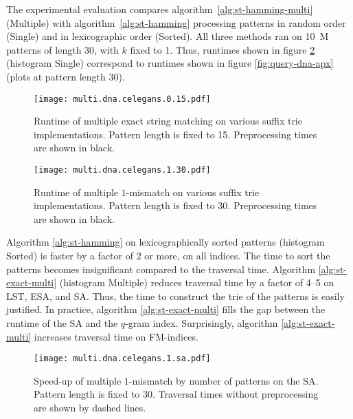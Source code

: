 The experimental evaluation compares algorithm~\ref{alg:st-hamming-multi} (Multiple) with algorithm~\ref{alg:st-hamming} processing patterns in random order (Single) and in lexicographic order (Sorted).
All three methods ran on 10~M patterns of length 30, with $k$ fixed to 1.
Thus, runtimes shown in figure \ref{fig:query-dna-apx-multi} (histogram Single) correspond to runtimes shown in figure \ref{fig:query-dna-apx} (plots at pattern length 30).

\begin{figure}[t]
\begin{center}
\caption[Multiple exact string matching runtime]{Runtime of multiple exact string matching on various suffix trie implementations. Pattern length is fixed to 15. Preprocessing times are shown in black.}
\label{fig:query-dna-exact-multi}
\texttt{[image: multi.dna.celegans.0.15.pdf]}
\end{center}
\vspace{-5mm}
\end{figure}

\begin{figure}[b]
\begin{center}
\caption[Multiple $k$-mismatches runtime]{Runtime of multiple $1$-mismatch on various suffix trie implementations. Pattern length is fixed to 30. Preprocessing times are shown in black.}
\label{fig:query-dna-apx-multi}
\texttt{[image: multi.dna.celegans.1.30.pdf]}
\end{center}
\end{figure}

Algorithm \ref{alg:st-hamming} on lexicographically sorted patterns (histogram Sorted) is faster by a factor of 2 or more, on all indices.
The time to sort the patterns becomes insignificant compared to the traversal time.
Algorithm \ref{alg:st-exact-multi} (histogram Multiple) reduces traversal time by a factor of 4--5 on LST, ESA, and SA.
Thus, the time to construct the trie of the patterns is easily justified.
In practice, algorithm \ref{alg:st-exact-multi} fills the gap between the runtime of the SA and the $q$-gram index.
Surprisingly, algorithm \ref{alg:st-exact-multi} increases traversal time on FM-indices.

\phantom{XXX}

\begin{figure}[t]
\begin{center}
\caption[Multiple $k$-mismatches speed-up on SA]{Speed-up of multiple $1$-mismatch by number of patterns on the SA. Pattern length is fixed to 30. Traversal times without preprocessing are shown by dashed lines.}
\label{fig:query-dna-apx-multi-sa}
\texttt{[image: multi.dna.celegans.1.sa.pdf]}
\end{center}
\end{figure}

